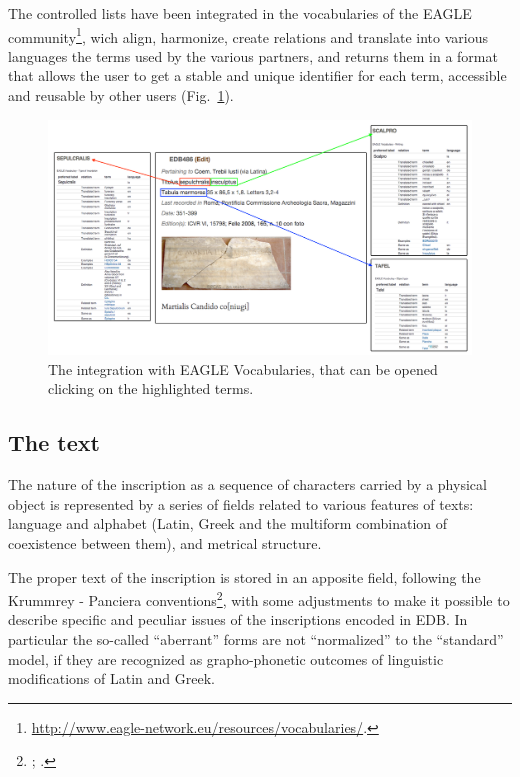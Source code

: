 \documentclass[amsthm,ebook]{saparticle}
\begin{document}
The controlled lists have been integrated in the vocabularies of the EAGLE community\footnote{
\url{http://www.eagle-network.eu/resources/vocabularies/}.}, wich align, harmonize, create relations and translate into
various languages the terms used by the various partners, and returns them in a format that allows the user to get a
stable and unique identifier for each term, accessible and reusable by other users (Fig.~\ref{fig:9}).

\begin{figure}[!hbp]
\centering
 \includegraphics[width=\columnwidth]{EAGLE2016Roccoengrev-img009.png}
\caption{The integration with EAGLE Vocabularies, that can be opened clicking on the highlighted terms.}
\label{fig:9}
\end{figure}


\newpage

\subsection{The text}


The nature of the inscription as a sequence of characters carried by a physical object is represented by a series of
fields related to various features of texts: language and alphabet (Latin, Greek and the multiform combination of
coexistence between them), and metrical structure.

The proper text of the inscription is stored in an apposite field, following the Krummrey - Panciera
conventions\footnote{\citet{krummrey_criteri_1980}; \citet{Panciera1991}.}, with some adjustments to make it possible to describe
specific and peculiar issues of the inscriptions encoded in EDB. In particular the so-called
``aberrant'' forms are not ``normalized'' to the
``standard'' model, if they are recognized as grapho-phonetic outcomes of linguistic
modifications of Latin and Greek. 
\end{document}
